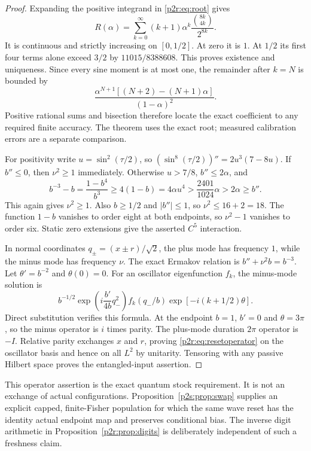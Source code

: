 \documentclass[11pt]{article}
\numberwithin{equation}{section}
\theoremstyle{definition}
\theoremstyle{remark}
\begin{document}
\begin{proof}
Expanding the positive integrand in \eqref{p2r:eq:root} gives
\begin{equation}\label{p2r:eq:rootseries}
 R(\alpha)=\sum_{k=0}^\infty
 (k+1)\alpha^k\frac{\binom{8k}{4k}}{2^{8k}}.
\end{equation}
It is continuous and strictly increasing on $[0,1/2]$.
At zero it is $1$. At $1/2$ its first four terms alone exceed
$3/2$ by $11015/8388608$. This proves existence and uniqueness.
Since every sine moment is at most one, the remainder after $k=N$
is bounded by
\begin{equation}\label{p2r:eq:roottail}
 \frac{\alpha^{N+1}[(N+2)-(N+1)\alpha]}{(1-\alpha)^2}.
\end{equation}
Positive rational sums and bisection therefore locate the exact
coefficient to any required finite accuracy. The theorem uses the
exact root; measured calibration errors are a separate comparison.

For positivity write $u=\sin^2(\tau/2)$, so
$(\sin^8(\tau/2))''=2u^3(7-8u)$.
If $b''\leq0$, then $\nu^2\geq1$ immediately. Otherwise
$u>7/8$, $b''\leq2\alpha$, and
\[
 b^{-3}-b=\frac{1-b^4}{b^3}
 \geq4(1-b)=4\alpha u^4
 >\frac{2401}{1024}\alpha>2\alpha\geq b''.
\]
This again gives $\nu^2\geq1$.
Also $b\geq1/2$ and $|b''|\leq1$, so
$\nu^2\leq16+2=18$.
The function $1-b$ vanishes to order eight at both endpoints,
so $\nu^2-1$ vanishes to order six. Static zero extensions
give the asserted $C^5$ interaction.

In normal coordinates $q_\pm=(x\pm r)/\sqrt2$, the plus mode
has frequency $1$, while the minus mode has frequency $\nu$.
The exact Ermakov relation is
$b''+\nu^2b=b^{-3}$.
Let $\theta'=b^{-2}$ and $\theta(0)=0$. For an oscillator
eigenfunction $f_k$, the minus-mode solution is
\[
 b^{-1/2}\exp\!\left(i\frac{b'}{4b}q_-^2\right)
 f_k(q_-/b)\exp[-i(k+1/2)\theta].
\]
Direct substitution verifies this formula. At the endpoint
$b=1$, $b'=0$ and $\theta=3\pi$, so the minus operator is
$i$ times parity. The plus-mode duration $2\pi$ operator is $-I$.
Relative parity exchanges $x$ and $r$, proving
\eqref{p2r:eq:resetoperator} on the oscillator basis and hence
on all $L^2$ by unitarity. Tensoring with any passive Hilbert
space proves the entangled-input assertion.
\end{proof}

This operator assertion is the exact quantum stock requirement.
It is not an exchange of actual configurations.
Proposition~\ref{p2s:prop:swap} supplies an explicit capped,
finite-Fisher population for which the same wave reset has the
identity actual endpoint map and preserves conditional bias.
The inverse digit arithmetic in Proposition~\ref{p2r:prop:digits}
is deliberately independent of such a freshness claim.
\end{document}
